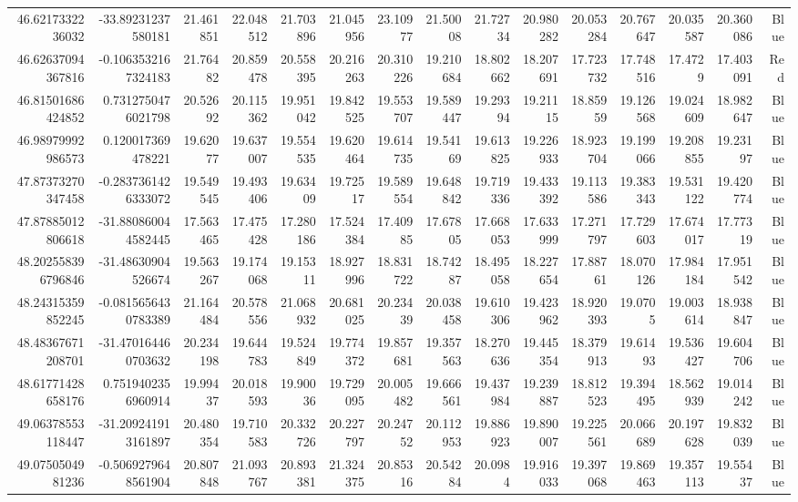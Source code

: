 \begin{center}
\begin{longtable}{rrrrrrrrrrrrrrr}
46.6217332236032 & -33.89231237580181 & 21.461851 & 22.048512 & 21.703896 & 21.045956 & 23.10977 & 21.50008 & 21.72734 & 20.980282 & 20.053284 & 20.767647 & 20.035587 & 20.360086 & Blue \\
46.62637094367816 & -0.1063532167324183 & 21.76482 & 20.859478 & 20.558395 & 20.216263 & 20.310226 & 19.210684 & 18.802662 & 18.207691 & 17.723732 & 17.748516 & 17.4729 & 17.403091 & Red \\
46.81501686424852 & 0.7312750476021798 & 20.52692 & 20.115362 & 19.951042 & 19.842525 & 19.553707 & 19.589447 & 19.29394 & 19.21115 & 18.85959 & 19.126568 & 19.024609 & 18.982647 & Blue \\
46.98979992986573 & 0.120017369478221 & 19.62077 & 19.637007 & 19.554535 & 19.620464 & 19.614735 & 19.54169 & 19.613825 & 19.226933 & 18.923704 & 19.199066 & 19.208855 & 19.23197 & Blue \\
47.87373270347458 & -0.2837361426333072 & 19.549545 & 19.493406 & 19.63409 & 19.72517 & 19.589554 & 19.648842 & 19.719336 & 19.433392 & 19.113586 & 19.383343 & 19.531122 & 19.420774 & Blue \\
47.87885012806618 & -31.880860044582445 & 17.563465 & 17.475428 & 17.280186 & 17.524384 & 17.40985 & 17.67805 & 17.668053 & 17.633999 & 17.271797 & 17.729603 & 17.674017 & 17.77319 & Blue \\
48.202558396796846 & -31.48630904526674 & 19.563267 & 19.174068 & 19.15311 & 18.927996 & 18.831722 & 18.74287 & 18.495058 & 18.227654 & 17.88761 & 18.070126 & 17.984184 & 17.951542 & Blue \\
48.24315359852245 & -0.0815656430783389 & 21.164484 & 20.578556 & 21.068932 & 20.681025 & 20.23439 & 20.038458 & 19.610306 & 19.423962 & 18.920393 & 19.0705 & 19.003614 & 18.938847 & Blue \\
48.48367671208701 & -31.470164460703632 & 20.234198 & 19.644783 & 19.524849 & 19.774372 & 19.857681 & 19.357563 & 18.270636 & 19.445354 & 18.379913 & 19.61493 & 19.536427 & 19.604706 & Blue \\
48.61771428658176 & 0.7519402356960914 & 19.99437 & 20.018593 & 19.90036 & 19.729095 & 20.005482 & 19.666561 & 19.437984 & 19.239887 & 18.812523 & 19.394495 & 18.562939 & 19.014242 & Blue \\
49.06378553118447 & -31.209241913161897 & 20.480354 & 19.710583 & 20.332726 & 20.227797 & 20.24752 & 20.112953 & 19.886923 & 19.890007 & 19.225561 & 20.066689 & 20.197628 & 19.832039 & Blue \\
49.0750504981236 & -0.5069279648561904 & 20.807848 & 21.093767 & 20.893381 & 21.324375 & 20.85316 & 20.54284 & 20.0984 & 19.916033 & 19.397068 & 19.869463 & 19.357113 & 19.55437 & Blue \\

\end{longtable}
\end{center}

